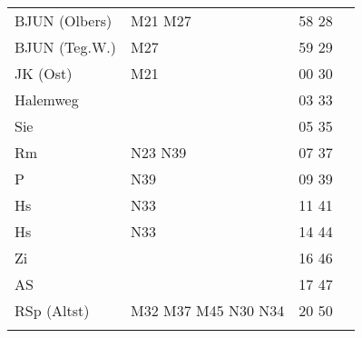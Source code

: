 \begin{tabular}{!{\color{schiefergrau}\vrule width 3pt}*{4}{l!{\color{schiefergrau}\vrule width 3pt}}}
BJUN (Olbers)& \mbus{} M21 M27                             & 58 28 &       \\
BJUN (Teg.W.)& \mbus{} M27                                 & 59 29 &       \\
JK (Ost)     & \mbus{} M21                                 & 00 30 &       \\
Halemweg     &                                             & 03 33 &       \\
Sie          &                                             & 05 35 &       \\
Rm           & \nbus{} N23 N39                             & 07 37 &       \\
P            & \nbus{} N39                                 & 09 39 &       \\
Hs           & \nbus{} N33                                 & 11 41 &       \\
\hline
Hs           & \nbus{} N33                                 & 14 44 &       \\
Zi           &                                             & 16 46 &       \\
AS           &                                             & 17 47 &       \\
RSp (Altst)  & \mbus{} M32 M37 M45 \nbus{} N30 N34         & 20 50 &       \\
\myhline
\end{tabular}
